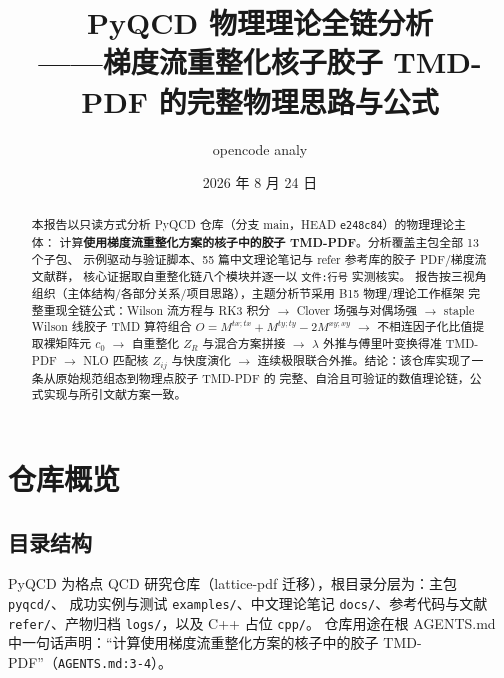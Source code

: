 \documentclass[UTF8]{ctexart}
\title{PyQCD 物理理论全链分析\\——梯度流重整化核子胶子 TMD-PDF 的完整物理思路与公式}
\author{opencode analy}
\date{2026 年 8 月 24 日}
\begin{document}
\maketitle

\begin{abstract}
本报告以只读方式分析 PyQCD 仓库（分支 main，HEAD \texttt{e248c84}）的物理理论主体：
计算\textbf{使用梯度流重整化方案的核子中的胶子 TMD-PDF}。分析覆盖主包全部 13 个子包、
示例驱动与验证脚本、55 篇中文理论笔记与 refer 参考库的胶子 PDF/梯度流文献群，
核心证据取自重整化链八个模块并逐一以 \texttt{文件:行号} 实测核实。
报告按三视角组织（主体结构/各部分关系/项目思路），主题分析节采用 B15 物理/理论工作框架
完整重现全链公式：Wilson 流方程与 RK3 积分 $\to$ Clover 场强与对偶场强 $\to$
staple Wilson 线胶子 TMD 算符组合 $O=M^{tx;tx}+M^{ty;ty}-2M^{xy;xy}$ $\to$
不相连因子化比值提取裸矩阵元 $c_0$ $\to$ 自重整化 $Z_R$ 与混合方案拼接 $\to$
$\lambda$ 外推与傅里叶变换得准 TMD-PDF $\to$ NLO 匹配核 $Z_{ij}$ 与快度演化 $\to$
连续极限联合外推。结论：该仓库实现了一条从原始规范组态到物理点胶子 TMD-PDF 的
完整、自洽且可验证的数值理论链，公式实现与所引文献方案一致。
\end{abstract}

\tableofcontents

\section{仓库概览}

\subsection{目录结构}
PyQCD 为格点 QCD 研究仓库（lattice-pdf 迁移），根目录分层为：主包 \texttt{pyqcd/}、
成功实例与测试 \texttt{examples/}、中文理论笔记 \texttt{docs/}、参考代码与文献
\texttt{refer/}、产物归档 \texttt{logs/}，以及 C++ 占位 \texttt{cpp/}。
仓库用途在根 AGENTS.md 中一句话声明：``计算使用梯度流重整化方案的核子中的胶子
TMD-PDF''（\texttt{\nolinkurl{AGENTS.md:3-4}}）。
\end{document}
